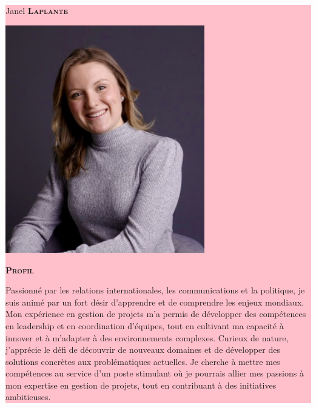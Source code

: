 \documentclass[11pt, a4paper]{article}
\newcommand{\headleft}[1]{\vspace*{3ex}\textsc{\textbf{#1}}\par%
    \vspace*{-1.5ex}\hrulefill\par\vspace*{0.7ex}}
\begin{document}
\setlength{\topskip}{0pt}
\setlength{\parindent}{0pt}
\setlength{\parskip}{0pt}
\setlength{\fboxsep}{0pt}
\pagestyle{empty}
\raggedbottom

\begin{minipage}[t]{0.33\textwidth} %
\colorbox{pink}{\begin{minipage}[t][5mm][t]{\textwidth}\null\hfill\null\end{minipage}}

\vspace{-.2ex} %
\colorbox{pink}{\color{white}  %
\textwidth\relax%
\begin{minipage}[t][293mm][t]{0.82\textwidth}
\raggedright
\vspace*{2.5ex}

\Large Janel \textbf{\textsc{Laplante}} \normalsize 

\null\hfill\includegraphics[width=0.65\textwidth]{portrait}\hfill\null

\vspace*{0.5ex} %

\headleft{Profil}
Passionné par les relations internationales, les communications et la politique, je suis animé par un fort désir d’apprendre et de comprendre les enjeux mondiaux. Mon expérience en gestion de projets m'a permis de développer des compétences en leadership et en coordination d'équipes, tout en cultivant ma capacité à innover et à m’adapter à des environnements complexes. Curieux de nature, j'apprécie le défi de découvrir de nouveaux domaines et de développer des solutions concrètes aux problématiques actuelles. Je cherche à mettre mes compétences au service d’un poste stimulant où je pourrais allier mes passions à mon expertise en gestion de projets, tout en contribuant à des initiatives ambitieuses.


\end{minipage}}
\end{minipage}
\end{document}

